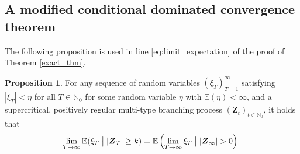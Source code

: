 \documentclass[preprint,3p,12pt]{elsarticle}
\theoremstyle{definition}
\newtheorem{proposition}{Proposition}
\begin{document}
\subsection{A modified conditional dominated convergence theorem}
\label{dominated}
The following proposition is used in line \eqref{eq:limit_expectation} of the proof of Theorem \ref{exact_thm}.
\begin{proposition}
For any sequence of random variables $(\xi_T)_{T=1}^{\infty}$ satisfying $|\xi_T| < \eta$ for all $T \in \mathbb{N}_0$ for some random variable $\eta$ with $\mathbb{E}(\eta) < \infty$, and a supercritical, positively regular multi-type branching process $(\boldsymbol{Z}_t)_{t\in\mathbb{N}_0}$, it holds that
      \begin{equation}
        \lim_{T \rightarrow \infty} \mathbb{E}(\xi_{T} \bigm| |\boldsymbol{Z}_T| \ge k)  =  \mathbb{E}\left(\lim_{T \rightarrow \infty}\xi_{T} \bigm| |\boldsymbol{Z}_{\infty}| > 0\right).
    \end{equation}
\end{proposition}
\end{document}
